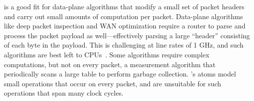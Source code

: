 \absmachine is a good fit for data-plane algorithms that modify a small set of
packet headers and carry out small amounts of computation per packet.
Data-plane algorithms like deep packet inspection and WAN optimization require
a router to parse and process the packet payload as well---effectively parsing
a large ``header'' consisting of each byte in the payload. This is challenging
at line rates of 1 GHz, and such algorithms are best left to CPUs~\cite{e2}.
Some algorithms require complex computations, but not on every packet, \eg a
measurement algorithm that periodically scans a large table to perform garbage
collection.  \absmachine's atoms model small operations that occur on every
packet, and are unsuitable for such operations that span many clock cycles.
